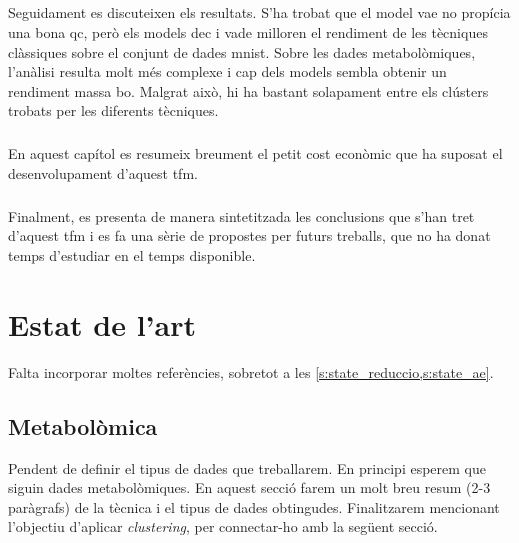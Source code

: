 \documentclass[CAT,BIB]{TFUOC}%
\newcommand{\todo}[1]{
            \begin{tcolorbox}[title=ToDo!, colback=red!5!white, colframe=red!50!black, coltext=red!50!black]
            #1
            \end{tcolorbox}}
\begin{document}
    \paragraph{ }
        Seguidament es discuteixen els resultats.
        S'ha trobat que el model \gls{vae}
        no propícia una bona \gls{qc},
        però els models \gls{dec} i \gls{vade}
        milloren el rendiment de les tècniques clàssiques
        sobre el conjunt de dades \gls{mnist}.
        Sobre les dades metabolòmiques,
        l'anàlisi resulta molt més complexe
        i cap dels models sembla obtenir un rendiment massa bo.
        Malgrat això,
        hi ha bastant solapament entre els clústers trobats per les diferents tècniques.

    \paragraph{ }
        En aquest capítol es resumeix breument
        el petit cost econòmic que ha suposat
        el desenvolupament d'aquest \gls{tfm}.

    \paragraph{ }
        Finalment,
        es presenta de manera sintetitzada les conclusions
        que s'han tret d'aquest \gls{tfm}
        i es fa una sèrie de propostes
        per futurs treballs,
        que no ha donat temps d'estudiar en el temps disponible.


\chapter{Estat de l'art}
\label{c:state}

\todo{Falta incorporar moltes referències, sobretot a les \cref{s:state_reduccio,s:state_ae}.}

    \section{Metabolòmica}
    \label{s:state_metabol}

\todo{
    Pendent de definir el tipus de dades que treballarem. En principi esperem que siguin dades metabolòmiques. En aquest secció farem un molt breu resum (2-3 paràgrafs) de la tècnica i el tipus de dades obtingudes. Finalitzarem mencionant l'objectiu d'aplicar \textit{clustering}, per connectar-ho amb la següent secció.
}
\end{document}
